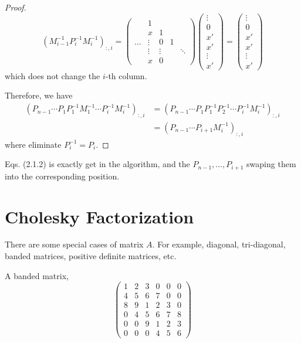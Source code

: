 \begin{proof}
\[        (M_{i-1}^{-1} P_{i}^{-1} M_{i}^{-1})_{:,i} = 
        \begin{pmatrix}
            & 1 & & & \\
            & x & 1 & & \\
            \hdots       & \vdots & 0 & 1 & \\
            & \vdots & \vdots & & \ddots \\
            & x & 0 && 
        \end{pmatrix}
        \begin{pmatrix}
            \vdots \\ 0 \\ x' \\ x' \\ \vdots \\ x'
        \end{pmatrix}
        = \begin{pmatrix}
            \vdots \\ 0 \\ x' \\ x' \\ \vdots \\ x'
        \end{pmatrix}
    \]
    which does not change the $i$-th column.

    Therefore, we have \begin{align*}
        (P_{n-1} \cdots P_1 P_1^{-1} M_1^{-1} \cdots P_{i}^{-1} M_{i}^{-1})_{:,i} &= (P_{n-1} \cdots P_{1} P_1^{-1} P_2^{-1} \cdots P_{i}^{-1} M_{i}^{-1})_{:,i} \\[3pt]
        &= (P_{n-1} \cdots P_{i+1} M_{i}^{-1})_{:,i}
    \end{align*}
    where eliminate $P_i^{-1} = P_i$.
\end{proof}

\begin{note}
    Eqs. (2.1.2) is exactly get in the algorithm, and the $P_{n-1}, \ldots, P_{i+1}$ swaping them into the corresponding position.
\end{note}

\section{Cholesky Factorization}

There are some special cases of matrix $A$. For example, diagonal, tri-diagonal, banded matrices, positive definite matrices, etc.

\begin{eg}
    A banded matrix,
    \[
        \begin{pmatrix}
            1 & 2 & 3 & 0 & 0 & 0\\
            4 & 5 & 6 & 7 & 0 & 0\\
            8 & 9 & 1 & 2 & 3 & 0\\
            0 & 4 & 5 & 6 & 7 & 8 \\
            0 & 0 & 9 & 1 & 2 & 3 \\
            0 & 0 & 0 & 4 & 5 & 6
        \end{pmatrix}
    \]
\end{eg}

